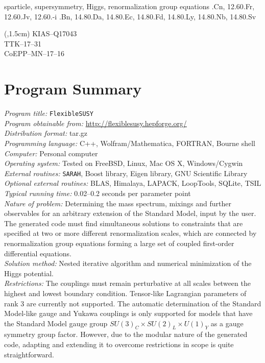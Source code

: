 \documentclass[final,3p,11pt,pdflatex]{elsarticle}
\makeatletter
\newcommand{\sarah}{\texttt{SARAH}\@\xspace}
\newcommand{\fs}{\texttt{FlexibleSUSY}\@\xspace}
\makeatother
\begin{document}
\begin{frontmatter}
\begin{keyword}
sparticle,
supersymmetry,
Higgs,
renormalization group equations
.Cn, 12.60.Fr, 12.60.Jv, 12.60.-i
.Bn, 14.80.Da, 14.80.Ec, 14.80.Fd, 14.80.Ly, 14.80.Nb, 14.80.Sv
\end{keyword}
\end{frontmatter}

\begin{textblock*}{10em}(\textwidth,1.5cm)
\raggedleft\noindent\footnotesize
KIAS--Q17043 \\
TTK--17--31 \\
CoEPP--MN--17--16
\end{textblock*}

\clearpage
{}
\section*{Program Summary}
\noindent
{\em Program title:} \fs\\[0.5em]
{\em Program obtainable from:} \url{http://flexiblesusy.hepforge.org/}\\[0.5em]
{\em Distribution format:} tar.gz\\[0.5em]
{\em Programming language:} C++, Wolfram/Mathematica, FORTRAN, Bourne shell\\[0.5em]
{\em Computer:} Personal computer\\[0.5em]
{\em Operating system:} Tested on FreeBSD, Linux, Mac OS X, Windows/Cygwin\\[0.5em]
{\em External routines:} \sarah, Boost library, Eigen library, GNU Scientific Library\\[0.5em]
{\em Optional external routines:} BLAS, Himalaya, LAPACK, LoopTools, SQLite, TSIL\\[0.5em]
{\em Typical running time:} 0.02--0.2 seconds per parameter point\\[0.5em]
{\em Nature of problem:}
%
Determining the mass spectrum, mixings and further observables for an arbitrary extension
of the Standard Model, input by the user. The generated code must find
simultaneous solutions to constraints that are specified at two or
more different renormalization scales, which are connected by
renormalization group equations forming a large set of coupled
first-order differential
equations. \\[0.5em]
%
{\em Solution method:}
%
Nested iterative algorithm and numerical
minimization of the Higgs potential.\\[0.5em]
%
{\em Restrictions:}
%
The couplings must remain perturbative at all scales between the
highest and lowest boundary condition.  Tensor-like Lagrangian
parameters of rank 3 are currently not supported.  The automatic
determination of the Standard Model-like gauge and Yukawa couplings is
only supported for models that have the Standard Model gauge group
$SU(3)_C\times SU(2)_L\times U(1)_Y$ as a gauge symmetry group factor.
However, due to the modular nature of the generated code, adapting and
extending it to overcome restrictions in scope is quite straightforward.
\end{document}
